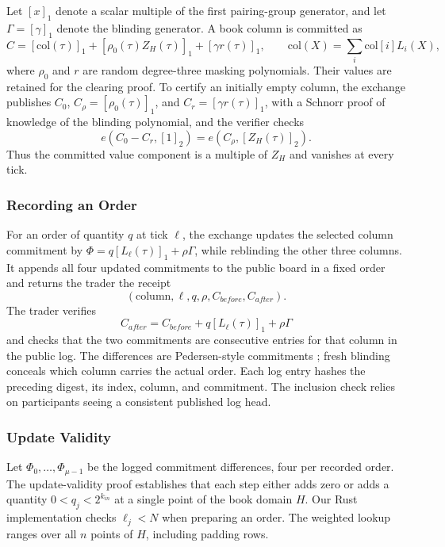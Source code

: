 Let \([x]_1\) denote a scalar multiple of the first pairing-group generator, and let \(\Gamma=[\gamma]_1\) denote the blinding generator. A book column is committed as
\[
C=[\mathrm{col}(\tau)]_1+[\rho_0(\tau)Z_H(\tau)]_1+[\gamma r(\tau)]_1,
\qquad \mathrm{col}(X)=\sum_i\mathrm{col}[i]L_i(X),
\]
where \(\rho_0\) and \(r\) are random degree-three masking polynomials. Their values are retained for the clearing proof. To certify an initially empty column, the exchange publishes \(C_0\), \(C_\rho=[\rho_0(\tau)]_1\), and \(C_r=[\gamma r(\tau)]_1\), with a Schnorr proof \cite{Sch91} of knowledge of the blinding polynomial, and the verifier checks
\[
e(C_0-C_r,[1]_2)=e(C_\rho,[Z_H(\tau)]_2).
\]
Thus the committed value component is a multiple of \(Z_H\) and vanishes at every tick.

\subsubsection{Recording an Order}

For an order of quantity \(q\) at tick \(\ell\), the exchange updates the selected column commitment by \(\Phi=q[L_\ell(\tau)]_1+\rho\Gamma\), while reblinding the other three columns. It appends all four updated commitments to the public board in a fixed order and returns the trader the receipt
\[
(\mathrm{column},\ell,q,\rho,C_{before},C_{after}).
\]
The trader verifies
\[
C_{after}=C_{before}+q[L_\ell(\tau)]_1+\rho\Gamma
\]
and checks that the two commitments are consecutive entries for that column in the public log. The differences are Pedersen-style commitments \cite{Ped91a}; fresh blinding conceals which column carries the actual order. Each log entry hashes the preceding digest, its index, column, and commitment. The inclusion check relies on participants seeing a consistent published log head.

\subsubsection{Update Validity}
\label{app:zq-update-validity}

Let \(\Phi_0,\ldots,\Phi_{\mu-1}\) be the logged commitment differences, four per recorded order. The update-validity proof establishes that each step either adds zero or adds a quantity \(0<q_j<2^{k_{in}}\) at a single point of the book domain \(H\). Our Rust implementation checks \(\ell_j<N\) when preparing an order. The weighted lookup ranges over all \(n\) points of \(H\), including padding rows.

